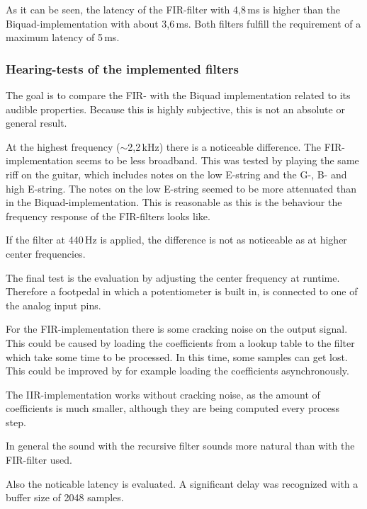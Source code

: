 As it can be seen, the latency of the \ac{FIR}-filter with 4,8\,ms is higher than the Biquad-implementation
with about 3,6\,ms. Both filters fulfill the requirement of a maximum latency of 5\,ms.

\subsubsection{Hearing-tests of the implemented filters}

The goal is to compare the \ac{FIR}- with the Biquad implementation related to its audible properties.
Because this is highly subjective, this is not an absolute or general result.

At the highest frequency ($\sim$2,2\,kHz) there is a noticeable difference. The \ac{FIR}-implementation seems
to be less broadband. This was tested by playing the same riff on the guitar, which includes notes on the low E-string and
the G-, B- and high E-string. The notes on the low E-string seemed to be more attenuated than in the
Biquad-implementation. This is reasonable as this is the behaviour the frequency response of the \ac{FIR}-filters
looks like.

If the filter at 440\,Hz is applied, the difference is not as noticeable as at higher center frequencies.

The final test is the evaluation by adjusting the center frequency at runtime. Therefore a footpedal in which
a potentiometer is built in, is connected to one of the analog input pins.

For the \ac{FIR}-implementation
there is some cracking noise on the output signal. This could be caused by loading the coefficients from a lookup table
to the filter which take some time to be processed. In this time, some samples can get lost.
This could be improved by for example loading the coefficients asynchronously.

The \ac{IIR}-implementation works without cracking noise, as the amount of coefficients is much smaller, although
they are being computed every process step.

In general the sound with the recursive filter sounds more \frqq natural\flqq{} than
with the \ac{FIR}-filter used.

Also the noticable latency is evaluated. A significant delay was recognized with a buffer size of 2048 samples.
